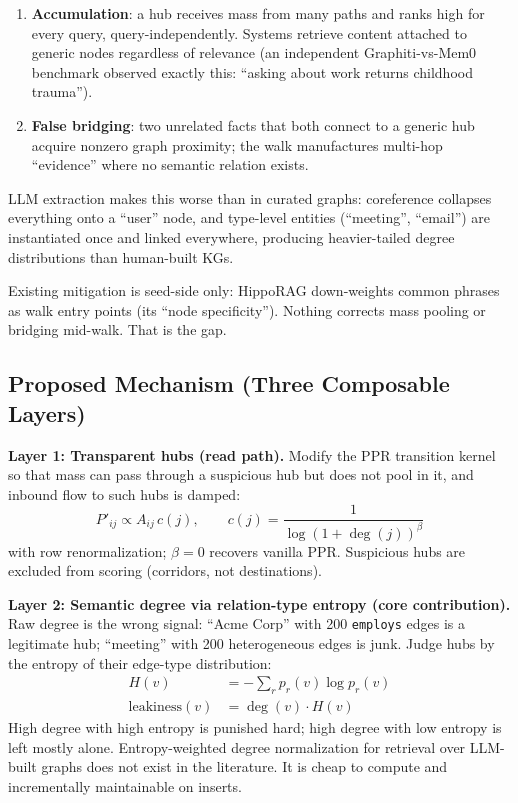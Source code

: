 \documentclass[11pt,a4paper]{article}
\newcommand{\code}[1]{\texttt{#1}}
\begin{document}
\begin{enumerate}[nosep]
  \item \textbf{Accumulation}: a hub receives mass from many paths and ranks high for every query, query-independently. Systems retrieve content attached to generic nodes regardless of relevance (an independent Graphiti-vs-Mem0 benchmark observed exactly this: ``asking about work returns childhood trauma'').
  \item \textbf{False bridging}: two unrelated facts that both connect to a generic hub acquire nonzero graph proximity; the walk manufactures multi-hop ``evidence'' where no semantic relation exists.
\end{enumerate}

LLM extraction makes this worse than in curated graphs: coreference collapses everything onto a ``user'' node, and type-level entities (``meeting'', ``email'') are instantiated once and linked everywhere, producing heavier-tailed degree distributions than human-built KGs.

Existing mitigation is seed-side only: HippoRAG down-weights common phrases as walk entry points (its ``node specificity''). Nothing corrects mass pooling or bridging mid-walk. That is the gap.

\subsection{Proposed Mechanism (Three Composable Layers)}

\textbf{Layer 1: Transparent hubs (read path).} Modify the PPR transition kernel so that mass can pass through a suspicious hub but does not pool in it, and inbound flow to such hubs is damped:
\begin{equation*}
P'_{ij} \propto A_{ij}\, c(j), \qquad c(j) = \frac{1}{\log\!\left(1 + \deg(j)\right)^{\beta}}
\end{equation*}
with row renormalization; $\beta = 0$ recovers vanilla PPR. Suspicious hubs are excluded from scoring (corridors, not destinations).

\textbf{Layer 2: Semantic degree via relation-type entropy (core contribution).} Raw degree is the wrong signal: ``Acme Corp'' with 200 \code{employs} edges is a legitimate hub; ``meeting'' with 200 heterogeneous edges is junk. Judge hubs by the entropy of their edge-type distribution:
\begin{align*}
H(v) &= -\sum_{r} p_r(v) \log p_r(v)\\
\mathrm{leakiness}(v) &= \deg(v)\cdot H(v)
\end{align*}
High degree with high entropy is punished hard; high degree with low entropy is left mostly alone. Entropy-weighted degree normalization for retrieval over LLM-built graphs does not exist in the literature. It is cheap to compute and incrementally maintainable on inserts.
\end{document}
